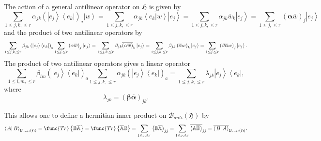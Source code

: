 \documentclass[aps,preprint]{revtex4}
\begin{document}
The action of a general antilinear operator on $\mathfrak{H}$ is given by 
\begin{equation}
\sum_{1\leq j,k,\leq r}\alpha_{jk}\left( \left\vert e_{j}\right\rangle
\left\langle e_{k}\right\vert \right) _{a}\left\vert w\right\rangle
=\sum_{1\leq j,k,\leq r}\alpha_{jk}\overline{\left\langle \left.
e_{k}\right\vert w\right\rangle }\left\vert e_{j}\right\rangle =\sum_{1\leq
j,k,\leq r}\alpha_{jk}\overline{w}_{k}\left\vert e_{j}\right\rangle
=\sum_{1\leq j,\leq r}\left( \mathbf{\alpha}\overline{w}\right)
_{j}\left\vert e_{j}\right\rangle
\end{equation}
and the product of two antilinear operators by 
\begin{equation}
\sum_{1\leq j,k,\leq r}\beta_{jk}\left( \left\vert e_{j}\right\rangle
\left\langle e_{k}\right\vert \right) _{a}\sum_{1\leq j,\leq r}\left( 
\mathbf{\alpha}\overline{w}\right) _{j}\left\vert e_{j}\right\rangle
=\sum_{1\leq j,k,\leq r}\beta_{jk}\overline{\left( \mathbf{\alpha}\overline{w%
}\right) }_{k}\left\vert e_{j}\right\rangle =\sum_{1\leq j,k,\leq
r}\beta_{jk}\left( \overline{\mathbf{\alpha}}w\right) _{k}\left\vert
e_{j}\right\rangle =\sum_{1\leq j,\leq r}\left( \mathbf{\beta}\overline {%
\mathbf{\alpha}}w\right) _{j}\left\vert e_{j}\right\rangle .
\end{equation}
The product of two antilinear operators gives a linear operator 
\begin{equation}
\sum_{1\leq l,m,\leq r}\beta_{lm}\left( \left\vert e_{j}\right\rangle
\left\langle e_{k}\right\vert \right) _{a}\sum_{1\leq j,k,\leq r}\alpha
_{jk}\left( \left\vert e_{j}\right\rangle \left\langle e_{k}\right\vert
\right) _{a}=\sum_{1\leq j,k,\leq r}\lambda_{jk}\left\vert
e_{j}\right\rangle \left\langle e_{k}\right\vert ,
\end{equation}
where 
\begin{equation}
\lambda_{jk}=\left( \mathbf{\beta}\overline{\mathbf{\alpha}}\right) _{jk}.
\end{equation}

This allows one to define a hermitian inner product on $\mathcal{B}%
_{anti}\left( \mathfrak{H}\right) $ by 
\begin{equation}
\left\langle \left. A\right\vert B\right\rangle _{\mathcal{B}_{anti}\left( 
\mathfrak{H}\right) }=\func{Tr}\left\{ \mathbb{B}\overline {\mathbb{A}}%
\right\} =\func{Tr}\left\{ \overline{\mathbb{A}}\mathbb{B}\right\}
=\sum_{1\leq j,\leq r}\left( \mathbb{B}\overline {\mathbb{A}}\right)
_{jj}=\sum_{1\leq j,\leq r}\overline{\left( \mathbb{A}\overline{\mathbb{B}}%
\right) }_{jj}=\overline{\left\langle \left. B\right\vert A\right\rangle }_{%
\mathcal{B}_{anti}\left( \mathfrak{H}\right) }.
\end{equation}
\end{document}
